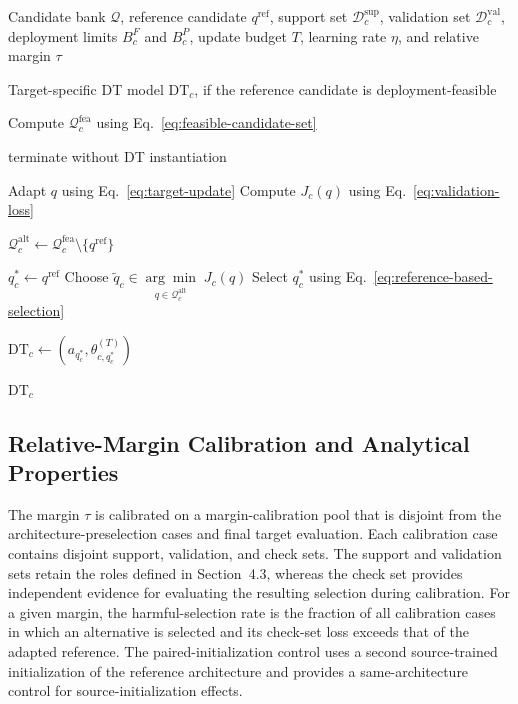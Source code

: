 \documentclass[a4paper,fleqn]{cas-sc}
\begin{document}
\begin{algorithm}[H]
\caption{Target-Side MSA-DTI for One Center}
\label{alg:msa-dti}
\begin{algorithmic}[1]

\Require Candidate bank $\mathcal{Q}$, reference candidate
$q^{\mathrm{ref}}$, support set $\mathcal{D}_{c}^{\mathrm{sup}}$,
validation set $\mathcal{D}_{c}^{\mathrm{val}}$, deployment limits
$B_c^{F}$ and $B_c^{P}$, update budget $T$,
learning rate $\eta$, and relative margin $\tau$

\Ensure Target-specific DT model $\mathrm{DT}_c$, if the reference candidate is deployment-feasible

\State Compute $\mathcal{Q}_{c}^{\mathrm{fea}}$ using
Eq.~\eqref{eq:feasible-candidate-set}

    \State terminate without DT instantiation
\EndIf

    \State Adapt $q$ using Eq.~\eqref{eq:target-update}
    \State Compute $J_c(q)$ using Eq.~\eqref{eq:validation-loss}
\EndFor

\State
$\mathcal{Q}_{c}^{\mathrm{alt}}
\gets
\mathcal{Q}_{c}^{\mathrm{fea}}
\setminus
\{q^{\mathrm{ref}}\}$

    \State $q_c^{*}\gets q^{\mathrm{ref}}$
\Else
    \State Choose
    $\widetilde q_c
    \in
    \underset{q\in\mathcal{Q}_{c}^{\mathrm{alt}}}
    {\arg\min}\;J_c(q)$
    \State Select $q_c^{*}$ using
    Eq.~\eqref{eq:reference-based-selection}
\EndIf

\State
$\mathrm{DT}_{c}
\gets
\left(
a_{q_c^{*}},
\theta_{c,q_c^{*}}^{(T)}
\right)$

\State \Return $\mathrm{DT}_{c}$

\end{algorithmic}
\end{algorithm}

\subsection{Relative-Margin Calibration and Analytical Properties}

The margin $\tau$ is calibrated on a margin-calibration pool that is disjoint
from the architecture-preselection cases and final target evaluation. Each
calibration case contains disjoint support, validation, and check sets. The
support and validation sets retain the roles defined in Section~4.3, whereas the check set
provides independent evidence for evaluating the resulting selection during
calibration. For a given margin, the harmful-selection rate is the fraction of
all calibration cases in which an alternative is selected and its check-set
loss exceeds that of the adapted reference. The paired-initialization control
uses a second source-trained initialization of the reference architecture and
provides a same-architecture control for source-initialization effects.
\end{document}
